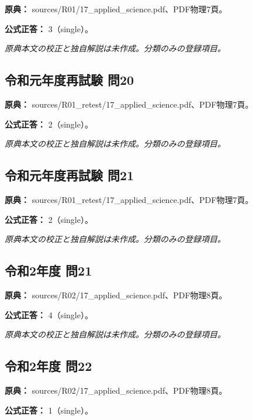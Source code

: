 \noindent\textbf{原典：} sources/R01/17\_applied\_science.pdf、PDF物理7頁。

\textbf{公式正答：} 3（single）。

\par\textit{原典本文の校正と独自解説は未作成。分類のみの登録項目。}

\subsection{令和元年度再試験 問20}
\label{q:r01-ret-applied-20}

\noindent\textbf{原典：} sources/R01\_retest/17\_applied\_science.pdf、PDF物理7頁。

\textbf{公式正答：} 2（single）。

\par\textit{原典本文の校正と独自解説は未作成。分類のみの登録項目。}

\subsection{令和元年度再試験 問21}
\label{q:r01-ret-applied-21}

\noindent\textbf{原典：} sources/R01\_retest/17\_applied\_science.pdf、PDF物理7頁。

\textbf{公式正答：} 2（single）。

\par\textit{原典本文の校正と独自解説は未作成。分類のみの登録項目。}

\subsection{令和2年度 問21}
\label{q:r02-reg-applied-21}

\noindent\textbf{原典：} sources/R02/17\_applied\_science.pdf、PDF物理8頁。

\textbf{公式正答：} 4（single）。

\par\textit{原典本文の校正と独自解説は未作成。分類のみの登録項目。}

\subsection{令和2年度 問22}
\label{q:r02-reg-applied-22}

\noindent\textbf{原典：} sources/R02/17\_applied\_science.pdf、PDF物理8頁。

\textbf{公式正答：} 1（single）。

